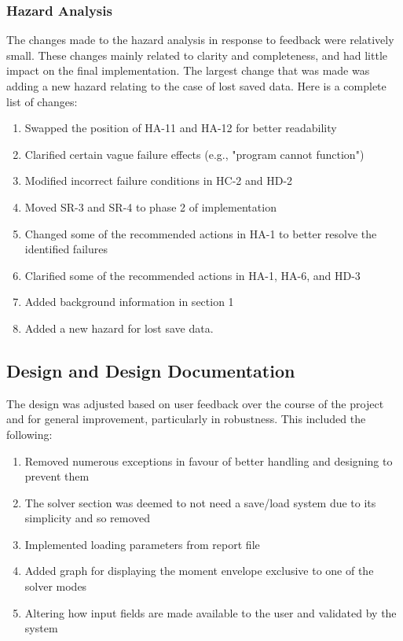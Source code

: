 \documentclass{article}
\begin{document}
\subsubsection{Hazard Analysis}
The changes made to the hazard analysis in response to feedback were relatively small. These changes mainly related to clarity and completeness, and had little impact on the final implementation. The largest change that was made was adding a new hazard relating to the case of lost saved data. Here is a complete list of changes:
\begin{enumerate}
  \item Swapped the position of HA-11 and HA-12 for better readability
  \item Clarified certain vague failure effects (e.g., "program cannot function")
  \item Modified incorrect failure conditions in HC-2 and HD-2
  \item Moved SR-3 and SR-4 to phase 2 of implementation
  \item Changed some of the recommended actions in HA-1 to better resolve the identified failures
  \item Clarified some of the recommended actions in HA-1, HA-6, and HD-3
  \item Added background information in section 1
  \item Added a new hazard for lost save data. 
\end{enumerate}


\subsection{Design and Design Documentation}
The design was adjusted based on user feedback over the course of the project and for general improvement, particularly in robustness. This included the following:
\begin{enumerate}
  \item Removed numerous exceptions in favour of better handling and designing to prevent them
  \item The solver section was deemed to not need a save/load system due to its simplicity and so removed
  \item Implemented loading parameters from report file
  \item Added graph for displaying the moment envelope exclusive to one of the solver modes
  \item Altering how input fields are made available to the user and validated by the system
\end{enumerate}
\end{document}
